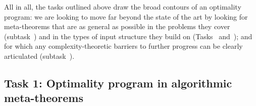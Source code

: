 \documentclass[a4paper,11pt]{article}
\newcommand{\fo}{\textsf{FO}\xspace}
\newcommand{\giannos}[1]{\noindent{\bf {\color{violet}{\sc Giannos:}  #1}}}
\begin{document}
\begin{enumerate}

\end{enumerate}

All in all, the tasks outlined above draw the broad contours of an optimality program: we are looking to move far beyond the state of the art by looking for meta-theorems that are as general as possible in the problems they cover (subtask~) and in the types of input structure they build on (Tasks~ and~); and for which any complexity-theoretic barriers to further progress can be clearly articulated (subtask~).

\subsection{Task 1: Optimality program in algorithmic meta-theorems}\label{task:1}

\end{document}
